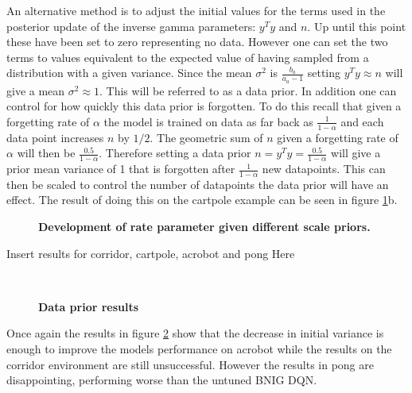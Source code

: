 An alternative method is to adjust the initial values for the terms used in the posterior update of the inverse gamma parameters: $y^Ty$ and $n$. Up until this point these have been set to zero representing no data. However one can set the two terms to values equivalent to the expected value of having sampled from a distribution with a given variance. Since the mean $\sigma^2$ is $\frac{b_a}{a_a-1}$ setting $y^Ty\approx n$ will give a mean $\sigma^2\approx 1$. This will be referred to as a data prior. In addition one can control for how quickly this data prior is forgotten. To do this recall that given a forgetting rate of $\alpha$ the model is trained on data as far back as $\frac{1}{1-\alpha}$ and each data point increases $n$ by $1/2$. The geometric sum of $n$ given a forgetting rate of $\alpha$ will then be $\frac{0.5}{1-\alpha}$. Therefore setting a data prior $n=y^Ty=\frac{0.5}{1-\alpha}$ will give a prior mean variance of 1 that is forgotten after $\frac{1}{1-\alpha}$ new datapoints. This can then be scaled to control the number of datapoints the data prior will have an effect. The result of doing this on the cartpole example can be seen in figure \ref{fig:scale_stability2}b.

\begin{figure}[H]
    \centering
    \caption{\textbf{Development of rate parameter given different scale priors.}}
    \label{fig:scale_stability2}
\end{figure}

\todo Insert results for corridor, cartpole, acrobot and pong Here

\begin{figure}[H] 
    \centering 
    \\
    \caption{\textbf{Data prior results}} 
    \label{fig:relative_scale} 
\end{figure}

Once again the results in figure \ref{fig:relative_scale} show that the decrease in initial variance is enough to improve the models performance on acrobot while the results on the corridor environment are still unsuccessful. However the results in pong are disappointing, performing worse than the untuned BNIG DQN.

\cleardoublepage